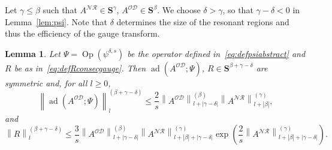 \documentclass[10pt]{amsart}
\newtheorem{lemm}[theo]{Lemma}\newtheorem{prop}[theo]{Proposition}\newtheorem{coro}[theo]{Corollary}\newtheorem{conj}[theo]{Conjecture}
\theoremstyle{definition}\newtheorem{defi}[theo]{Definition}\newtheorem{rema}[theo]{Remark}\newtheorem{exam}[theo]{Example}\newtheorem{nota}[theo]{Notation}
\DeclareMathOperator{\ad}{ad}
\DeclareMathOperator{\Op}{Op}
\newcommand{\CD}{\mathcal{D}}
\newcommand{\CN}{\mathcal{N}}
\newcommand{\CO}{\mathcal{O}}
\newcommand{\CR}{\mathcal{R}}
\newcommand{\COD}{{\CO\CD}}
\newcommand{\CNR}{{\CN\!\CR}}
\newcommand{\BS}{\mathbf S}
\newcommand{\resc}{s}
\newcommand{\abs}[1]{\left\lvert #1 \right\rvert}
\newcommand{\snorm}[3]{\left\| #1\right\|_{#3}^{(#2)}}
\begin{document}
Let $\gamma\leq\beta$ such that $A^{\CNR}\in\BS^\gamma$, $A^{\COD}\in\BS^\beta$. We choose $\delta >\gamma$, so that $\gamma -\delta< 0$ in Lemma~\ref{lem:psi}. Note that $\delta$ determines the size of the resonant regions and thus the efficiency of the gauge transform.
\begin{lemm}\label{lem:onestepweakgauge}
Let $\Psi=\Op(\psi^{\delta, s})$ be the operator defined in~\eqref{eq:defpsiabstract} and $R$ be as in~\eqref{eq:defRconsecgauge}. Then $\ad(A^\COD;\Psi)$, $R\in \BS^{\beta+\gamma - \delta}$ are symmetric and, for all $l\geq 0$,
\begin{equation}\label{eq:comaodpsi}
\snorm{\ad\left(A^\COD;\Psi\right)}{\beta+\gamma-\delta}{l}\le \frac{2}{\resc} \snorm{A^\COD}{\beta}{l + \abs{\gamma - \delta}}\snorm{A^\CNR}{\gamma}{l + \abs{\beta}},
\end{equation}
and
\begin{equation}\label{eq:Rnormboundsweak}
\snorm{R}{\beta+\gamma-\delta}l \le \frac{3}{\resc} \snorm{A^\COD}{\beta}{l + \abs{\gamma - \delta}}\snorm{A^\CNR}{\gamma}{l + \abs\beta+\abs{\gamma - \delta}}
\exp\left(\frac 2 \resc \snorm{A^\CNR}{\gamma}{l + \abs\beta+\abs{\gamma - \delta}}\right).
\end{equation}
\end{lemm}
\end{document}
